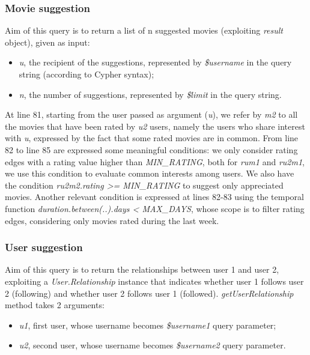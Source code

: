 \documentclass[11pt]{article}
\begin{document}
\subsubsection{Movie suggestion}
Aim of this query is to return a list of n suggested movies (exploiting \emph{result} object), given as input:
\begin{itemize}
    \item \emph{u}, the recipient of the suggestions, represented by \emph{\$username} in the query string (according to Cypher syntax);
    \item \emph{n}, the number of suggestions, represented by \emph{\$limit} in the query string.
\end{itemize}



At line 81, starting from the user passed as argument (\emph{u}), we refer by \emph{m2} to all the movies that have been rated by \emph{u2} users, namely the users who share interest with \emph{u}, expressed by the fact that some rated movies are in common. 
From line 82 to line 85 are expressed some meaningful conditions: we only consider rating edges with a rating value higher than \emph{MIN\_RATING}, both for \emph{rum1} and \emph{ru2m1}, we use this condition to evaluate common interests among users. We also have the condition \emph{ru2m2.rating >= MIN\_RATING} to suggest only appreciated movies. Another relevant condition is expressed at lines 82-83 using the temporal function \emph{duration.between(..).days < MAX\_DAYS}, whose scope is to filter rating edges, considering only movies rated during the last week. 

\subsubsection{User suggestion}
Aim of this query is to return the relationships between user 1 and user 2, exploiting a \emph{User.Relationship} instance that indicates whether user 1 follows user 2 (following) and whether user 2 follows user 1 (followed).
\emph{getUserRelationship} method takes 2 arguments:

\begin{itemize}
    \item \emph{u1}, first user, whose username becomes \emph{\$username1} query parameter;
    \item \emph{u2}, second user, whose username becomes \emph{\$username2} query parameter.
\end{itemize}
\end{document}
